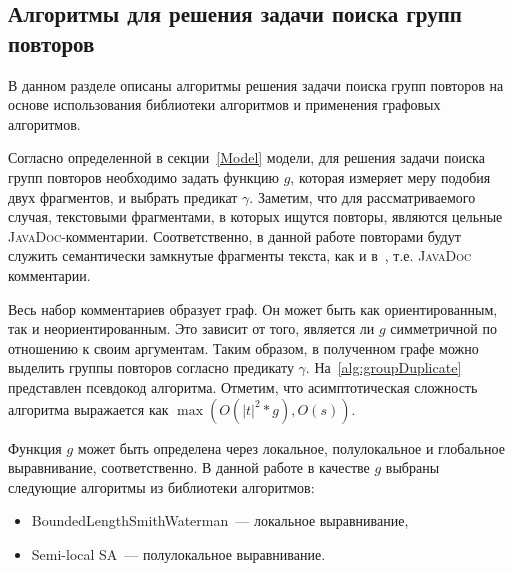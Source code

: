 



\subsection{Алгоритмы для решения задачи поиска групп повторов}\label{grouppa}
В данном разделе описаны алгоритмы решения задачи поиска групп повторов на основе использования библиотеки алгоритмов и применения графовых алгоритмов.

Согласно определенной в секции~\ref{Model} модели, для решения задачи поиска групп повторов необходимо задать функцию $g$, которая измеряет меру подобия двух фрагментов, и выбрать предикат $\gamma$.
Заметим, что для рассматриваемого случая, текстовыми фрагментами, в которых ищутся повторы, являются цельные \textsc{JavaDoc}-комментарии.
Соответственно, в данной работе повторами будут служить семантически замкнутые фрагменты текста, как и в~\cite{soto2015similarity}, т.е. \textsc{JavaDoc} комментарии.

Весь набор комментариев образует граф.
Он может быть как ориентированным, так и неориентированным.
Это зависит  от того, является ли $g$ симметричной по отношению к своим аргументам.
Таким образом, в полученном графе можно выделить группы повторов согласно предикату $\gamma$.
На~\ref{alg:groupDuplicate} представлен псевдокод алгоритма.
Отметим, что асимптотическая сложность алгоритма выражается как $\max (O(|t|^2*g), O(s))$.

Функция $g$ может быть определена через локальное, полулокальное и глобальное выравнивание, соответственно.
В данной работе в качестве $g$ выбраны следующие алгоритмы из библиотеки алгоритмов:
\begin{itemize}
    \item BoundedLengthSmithWaterman~--- локальное выравнивание,
    \item {Semi-local SA}~--- полулокальное выравнивание.
\end{itemize}

